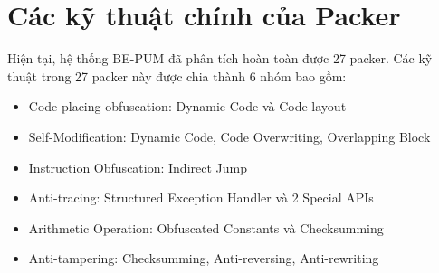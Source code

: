 \section{Các kỹ thuật chính của Packer}

\hspace{0.5cm}Hiện tại, hệ thống BE-PUM đã phân tích hoàn toàn được 27 packer. Các kỹ thuật trong 27 packer này được chia thành 6 nhóm bao gồm:

\begin{itemize}
\item{Code placing obfuscation: Dynamic Code và Code layout}
\item{Self-Modification: Dynamic Code, Code Overwriting, Overlapping Block}
\item{Instruction Obfuscation: Indirect Jump}
\item{Anti-tracing: Structured Exception Handler và 2 Special APIs}
\item{Arithmetic Operation: Obfuscated Constants và Checksumming}
\item{Anti-tampering: Checksumming, Anti-reversing, Anti-rewriting}
\end{itemize}

